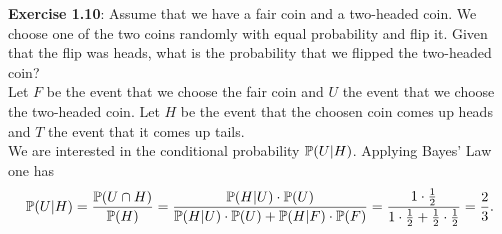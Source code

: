 \textbf{Exercise 1.10}: Assume that we have a fair coin and a two-headed coin.
We choose one of the two coins randomly with equal probability and flip it. Given
that the flip was heads, what is the probability that we flipped the two-headed coin? \\
Let $F$ be the event that we choose the fair coin and $U$ the event that we choose
the two-headed coin. Let $H$ be the event that the choosen coin comes up heads
and $T$ the event that it comes up tails. \\
We are interested in the conditional probability $\mathbb{P}(U|H)$. Applying Bayes' Law
one has
\[ \mathbb{P}(U|H)
    = \frac{\mathbb{P}(U \cap H)}{\mathbb{P}(H)}
    =\frac{\mathbb{P}(H|U) \cdot \mathbb{P}(U)}{\mathbb{P}(H|U) \cdot \mathbb{P}(U) + \mathbb{P}(H|F) \cdot \mathbb{P}(F)}
    =\frac{1 \cdot \frac{1}{2}}{1 \cdot \frac{1}{2} + \frac{1}{2} \cdot \frac{1}{2}}
    = \frac{2}{3}.
\]
